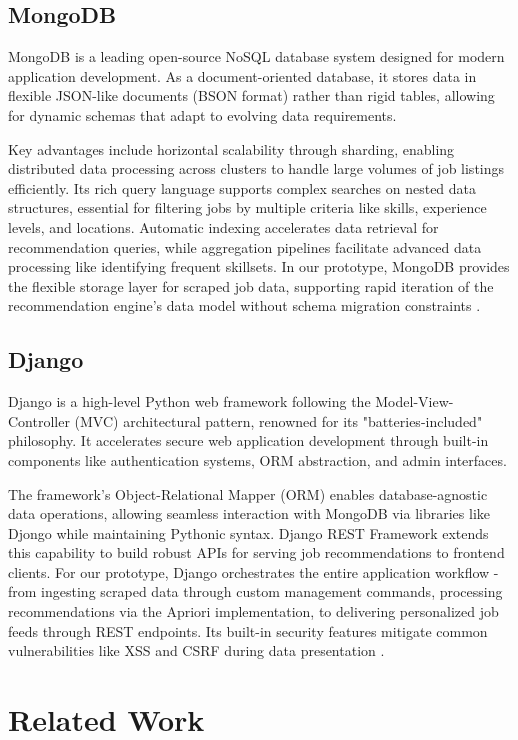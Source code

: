 \documentclass{svproc} %
\begin{document}
	\subsection{MongoDB}
	MongoDB is a leading open-source NoSQL database system designed for modern application development. As a document-oriented database, it stores data in flexible JSON-like documents (BSON format) rather than rigid tables, allowing for dynamic schemas that adapt to evolving data requirements.
	
	Key advantages include horizontal scalability through sharding, enabling distributed data processing across clusters to handle large volumes of job listings efficiently. Its rich query language supports complex searches on nested data structures, essential for filtering jobs by multiple criteria like skills, experience levels, and locations. Automatic indexing accelerates data retrieval for recommendation queries, while aggregation pipelines facilitate advanced data processing like identifying frequent skillsets. In our prototype, MongoDB provides the flexible storage layer for scraped job data, supporting rapid iteration of the recommendation engine's data model without schema migration constraints \cite{mongodbdocs}.
	
	\subsection{Django}
	Django is a high-level Python web framework following the Model-View-Controller (MVC) architectural pattern, renowned for its "batteries-included" philosophy. It accelerates secure web application development through built-in components like authentication systems, ORM abstraction, and admin interfaces.
	
	The framework's Object-Relational Mapper (ORM) enables database-agnostic data operations, allowing seamless interaction with MongoDB via libraries like Djongo while maintaining Pythonic syntax. Django REST Framework extends this capability to build robust APIs for serving job recommendations to frontend clients. For our prototype, Django orchestrates the entire application workflow - from ingesting scraped data through custom management commands, processing recommendations via the Apriori implementation, to delivering personalized job feeds through REST endpoints. Its built-in security features mitigate common vulnerabilities like XSS and CSRF during data presentation \cite{djangodocs}.
	
	\section{Related Work}
	
\end{document}
